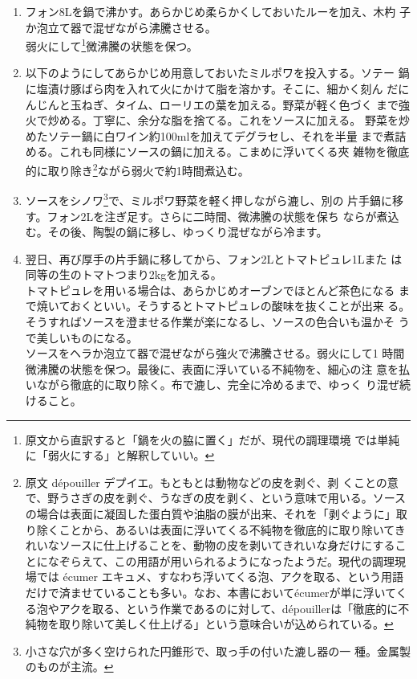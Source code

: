 \begin{enumerate}
\def\labelenumi{\arabic{enumi}.}
\item
  フォン8Lを鍋で沸かす。あらかじめ柔らかくしておいたルーを加え、木杓
  子か泡立て器で混ぜながら沸騰させる。\\
  弱火にして\footnote{原文から直訳すると「鍋を火の脇に置く」だが、現代の調理環境
    では単純に「弱火にする」と解釈していい。}微沸騰の状態を保つ。
\item
  以下のようにしてあらかじめ用意しておいたミルポワを投入する。ソテー
  鍋に塩漬け豚ばら肉を入れて火にかけて脂を溶かす。そこに、細かく刻ん
  だにんじんと玉ねぎ、タイム、ローリエの葉を加える。野菜が軽く色づく
  まで強火で炒める。丁寧に、余分な脂を捨てる。これをソースに加える。
  野菜を炒めたソテー鍋に白ワイン約100mlを加えてデグラセし、それを半量
  まで煮詰める。これも同様にソースの鍋に加える。こまめに浮いてくる夾
  雑物を徹底的に取り除き\footnote{原文 dépouiller
    デプイエ。もともとは動物などの皮を剥ぐ、剥
    くことの意で、野うさぎの皮を剥ぐ、うなぎの皮を剥く、という意味で用いる。ソースの場合は表面に凝固した蛋白質や油脂の膜が出来、それを「剥ぐように」取り除くことから、あるいは表面に浮いてくる不純物を徹底的に取り除いてきれいなソースに仕上げることを、動物の皮を剥いてきれいな身だけにすることになぞらえて、この用語が用いられるようになったようだ。現代の調理現場では
    écumer
    エキュメ、すなわち浮いてくる泡、アクを取る、という用語だけで済ませていることも多い。なお、本書においてécumerが単に浮いてくる泡やアクを取る、という作業であるのに対して、dépouillerは「徹底的に不純物を取り除いて美しく仕上げる」という意味合いが込められている。}ながら弱火で約1時間煮込む。
\item
  ソースをシノワ\footnote{小さな穴が多く空けられた円錐形で、取っ手の付いた漉し器の一
    種。金属製のものが主流。}で、ミルポワ野菜を軽く押しながら漉し、別の
  片手鍋に移す。フォン2Lを注ぎ足す。さらに二時間、微沸騰の状態を保ち
  ならが煮込む。その後、陶製の鍋に移し、ゆっくり混ぜながら冷ます。
\item
  翌日、再び厚手の片手鍋に移してから、フォン2Lとトマトピュレ1Lまた
  は同等の生のトマトつまり2kgを加える。\\
  トマトピュレを用いる場合は、あらかじめオーブンでほとんど茶色になる
  まで焼いておくといい。そうするとトマトピュレの酸味を抜くことが出来
  る。\\
  そうすればソースを澄ませる作業が楽になるし、ソースの色合いも温かそ
  うで美しいものになる。\\
  ソースをヘラか泡立て器で混ぜながら強火で沸騰させる。弱火にして1
  時間微沸騰の状態を保つ。最後に、表面に浮いている不純物を、細心の注
  意を払いながら徹底的に取り除く。布で漉し、完全に冷めるまで、ゆっく
  り混ぜ続けること。
\end{enumerate}

